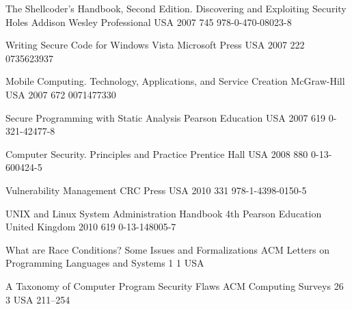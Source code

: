 \begin{thebibliography}{9}
		{
			\BibAnd
			\BibAnd
			\BibAnd
			}
		{The Shellcoder's Handbook, Second Edition. Discovering and Exploiting Security Holes}
		{}
		{Addison Wesley Professional}
		{USA}
		{2007}
		{745}
		{978-0-470-08023-8}
	
		{
			\BibAnd
			}
		{Writing Secure Code for {W}indows {V}ista}
		{}
		{Microsoft Press}
		{USA}
		{2007}
		{222}
		{0735623937}
	
		{
			\BibAnd
			}
		{Mobile Computing. Technology, Applications, and Service Creation}
		{}
		{McGraw-Hill}
		{USA}
		{2007}
		{672}
		{0071477330}
	
		{}
		{Secure Programming with Static Analysis}
		{}
		{Pearson Education}
		{USA}
		{2007}
		{619}
		{0-321-42477-8}
	
		{
			\BibAnd
			}
		{Computer Security. Principles and Practice}
		{}
		{Prentice Hall}
		{USA}
		{2008}
		{880}
		{0-13-600424-5}
	
		{}
		{Vulnerability Management}
		{}
		{CRC Press}
		{USA}
		{2010}
		{331}
		{978-1-4398-0150-5}
	
		{
			\BibAnd
			\BibAnd
			\BibAnd
			}
		{{UNIX} and {L}inux System Administration Handbook}
		{4th}
		{Pearson Education}
		{United Kingdom}
		{2010}
		{619}
		{0-13-148005-7}
		

		{
			\BibAnd
			}
		{What are Race Conditions? Some Issues and Formalizations}
		{ACM Letters on Programming Languages and Systems}
		{1}
		{1}
		{USA}
		{}
		{}
	
		{
			\BibAnd
			\BibAnd
			\BibAnd
			}
		{A Taxonomy of Computer Program Security Flaws}
		{ACM Computing Surveys}
		{26}
		{3}
		{USA}
		{}
		{211--254}
		

\end{thebibliography}
